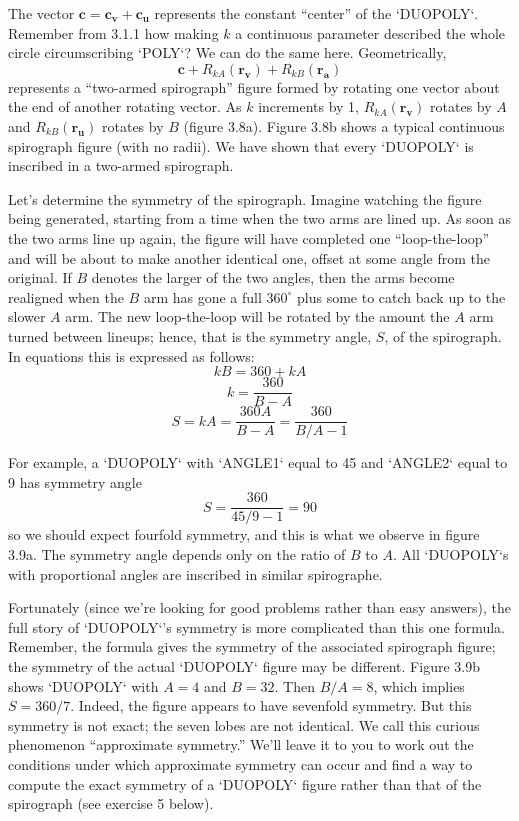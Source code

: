 \documentclass{book}
\begin{document}
The vector $\mathbf{c} = \mathbf{c_v} + \mathbf{c_u}$ represents the constant ``center'' of the
\textsc{`DUOPOLY`}. Remember from 3.1.1 how making $k$ a continuous parameter
described the whole circle circumscribing \textsc{`POLY`}? We can do the same
here. Geometrically, $$\mathbf{c} + R_{kA}(\mathbf{r_v}) + R_{kB}(\mathbf{r_a})$$ represents a ``two-armed spirograph'' figure formed by rotating one vector about the end of another rotating vector. As $k$ increments by 1,
$R_{kA}(\mathbf{r_v})$ rotates by $A$ and $R_{kB}(\mathbf{r_u})$ rotates by $B$ (figure 3.8a). Figure
3.8b shows a typical continuous spirograph figure (with no radii). We
have shown that every \textsc{`DUOPOLY`} is inscribed in a two-armed spirograph.

Let's determine the symmetry of the spirograph. Imagine watching
the figure being generated, starting from a time when the two arms
are lined up. As soon as the two arms line up again, the figure will
have completed one ``loop-the-loop'' and will be about to make another
identical one, offset at some angle from the original. If $B$ denotes the
larger of the two angles, then the arms become realigned when the $B$
arm has gone a full $360^{\circ}$ plus some to catch back up to the slower $A$
arm. The new loop-the-loop will be rotated by the amount the $A$ arm
turned between lineups; hence, that is the symmetry angle, $S$, of the
spirograph. In equations this is expressed as follows:$$kB = 360 + kA$$ $$k = \frac{360}{B-A}$$ $$S = kA = \frac{360A}{B-A} = \frac{360}{B/A - 1}$$

For example, a \textsc{`DUOPOLY`} with \textsc{`ANGLE1`} equal to 45 and \textsc{`ANGLE2`} equal
to 9 has symmetry angle $$S = \frac{360}{45/9 - 1} = 90 $$ so we should expect fourfold symmetry, and this is what we observe in
figure 3.9a. The symmetry angle depends only on the ratio of $B$ to $A$. All
\textsc{`DUOPOLY`}s with proportional angles are inscribed in similar spirographe.

Fortunately (since we're looking for good problems rather than easy
answers), the full story of \textsc{`DUOPOLY`}'s symmetry is more complicated than
this one formula. Remember, the formula gives the symmetry of the
associated spirograph figure; the symmetry of the actual \textsc{`DUOPOLY`} figure
may be different. Figure 3.9b shows \textsc{`DUOPOLY`} with $A = 4$ and $B = 32$.
Then $B/A = 8$, which implies $S = 360/7$. Indeed, the figure appears
to have sevenfold symmetry. But this symmetry is not exact; the seven
lobes are not identical. We call this curious phenomenon ``approximate
symmetry.'' We'll leave it to you to work out the conditions under which
approximate symmetry can occur and find a way to compute the exact
symmetry of a \textsc{`DUOPOLY`} figure rather than that of the spirograph (see
exercise 5 below).
\end{document}
